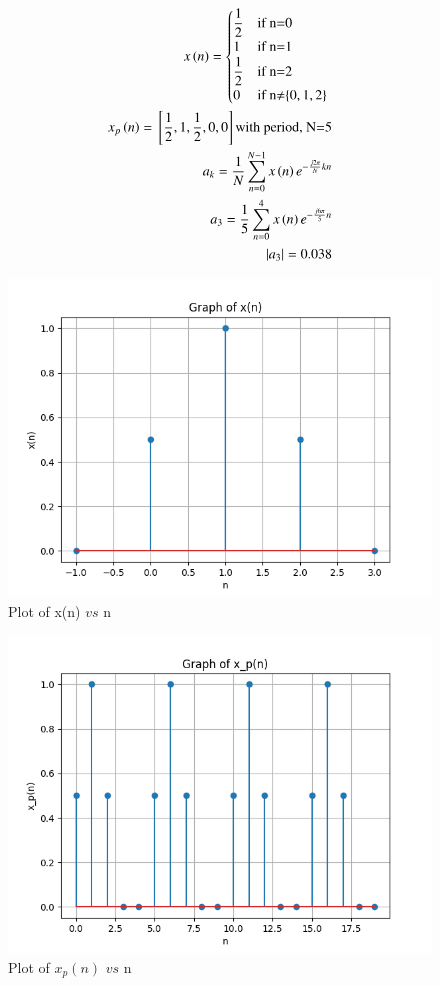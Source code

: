 \documentclass[journal,12pt,twocolumn]{IEEEtran}
\theoremstyle{remark}
\begin{document}
\begin{align}
    x\left(n\right)=
    \begin{cases}
        \dfrac{1}{2} & \text{if n=0}\\
        1 & \text{if n=1}\\
        \dfrac{1}{2} & \text{if n=2}\\
        0 & \text{if n$\neq$\ensuremath{\left\{0,1,2\right\}} }
    \end{cases}\\
    x_{p}\left(n\right)={}\left[\frac{1}{2},1,\frac{1}{2},0,0\right] \text{with period, N=5}\\
    a_k=\frac{1}{N}\sum^{N-1}_{n=0}x\left(n\right)e^{-\frac{j2\pi}{N}kn}\\
    a_3=\frac{1}{5}\sum^{4}_{n=0}x\left(n\right)e^{-\frac{j6\pi}{5}n}\\
    |a_3|=0.038
\end{align}
\begin{figure}[ht]
    \centering
    \includegraphics[width=\columnwidth]{figs/Figure_1.png}
    \caption{Plot of x(n) $vs$ n}
    \label{fig:50.1}
\end{figure}
\begin{figure}[ht]
    \centering
    \includegraphics[width=\columnwidth]{figs/Figure_2.png}
    \caption{Plot of $x_p(n)$ $vs$ n}
    \label{fig:50.2}
\end{figure}
\end{document}
